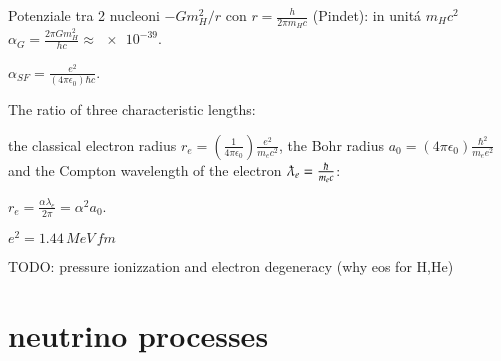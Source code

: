 \documentclass[main.tex]{subfiles}
\begin{document}
Potenziale tra 2 nucleoni $-Gm_H^2/r$ con $r=\frac{h}{2\pi m_Hc}$ (Pindet): in unit\'a $m_Hc^2$ $\alpha_G=\frac{2\pi Gm_H^2}{hc}\approx\num{e-39}$.

$\alpha_{SF}=\frac{e^2}{(4\pi\epsilon_0)\hbar c}$.

The ratio of three characteristic lengths:

the classical electron radius $r_e=(\frac{1}{4\pi\epsilon_0})\frac{e^2}{m_ec^2}$, the Bohr radius $a_0=(4\pi\epsilon_0)\frac{\hbar^2}{m_ee^2}$  and the Compton wavelength of the electron $\lambdabar_e=\frac{\hbar}{m_ec}$:

$r_e=\frac{\alpha\lambda_e}{2\pi}=\alpha^2a_0$.

$e^2=1.44\,MeV\,fm$

TODO: pressure ionizzation and electron degeneracy (why eos for H,He)

\section{neutrino processes}
\end{document}

